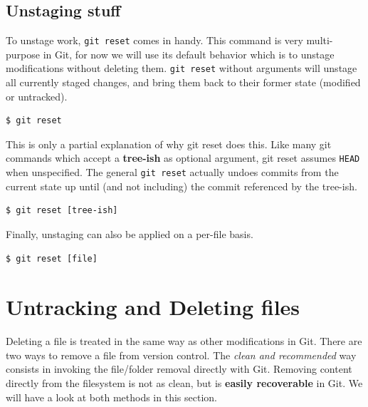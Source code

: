 \documentclass{../common/tufte-latex/tufte-handout}
\begin{document}
\subsection{Unstaging stuff}

To unstage work, \texttt{git reset} comes in handy.
This command is very multi-purpose in Git, for now we will use its default behavior which is to unstage modifications without deleting them.
\texttt{git reset} without arguments will unstage all currently staged changes, and bring them back to their former state (modified or untracked).


\begin{lstlisting}[style=BashInputStyle]
  $ git reset 
\end{lstlisting}

This is only a partial explanation of why git reset does this.
Like many git commands which accept a \textbf{tree-ish} as optional argument, git reset assumes \texttt{HEAD} when unspecified.
The general \texttt{git reset} actually undoes commits from the current state up until (and not including) the commit referenced by the tree-ish.

\begin{lstlisting}[style=BashInputStyle]
  $ git reset [tree-ish]
\end{lstlisting}

Finally, unstaging can also be applied on a per-file basis.

\begin{lstlisting}[style=BashInputStyle]
  $ git reset [file]
\end{lstlisting}

\section{Untracking and Deleting files}

Deleting a file is treated in the same way as other modifications in Git.
There are two ways to remove a file from version control.
The \textit{clean and recommended} way consists in invoking the file/folder removal directly with Git.
Removing content directly from the filesystem is not as clean, but is \textbf{easily recoverable} in Git.
We will have a look at both methods in this section.
\end{document}
